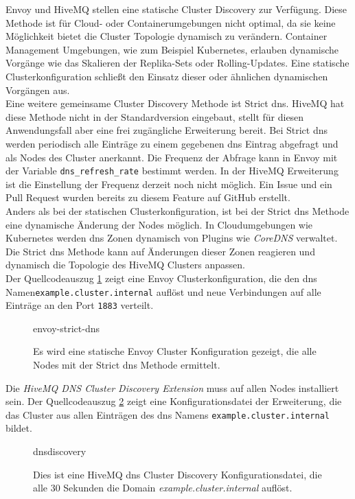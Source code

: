Envoy und HiveMQ stellen eine statische Cluster Discovery zur Verfügung. Diese Methode ist für Cloud- oder Containerumgebungen nicht optimal, da sie keine Möglichkeit bietet die Cluster Topologie dynamisch zu verändern. Container Management Umgebungen, wie zum Beispiel Kubernetes, erlauben dynamische Vorgänge wie das Skalieren der Replika-Sets oder Rolling-Updates. Eine statische Clusterkonfiguration schlie{\ss}t den Einsatz dieser oder ähnlichen dynamischen Vorgängen aus.\\
Eine weitere gemeinsame Cluster Discovery Methode ist Strict \ac{dns}. HiveMQ hat diese Methode nicht in der Standardversion eingebaut, stellt für diesen Anwendungsfall aber eine frei zugängliche Erweiterung bereit.
Bei Strict \ac{dns} werden periodisch alle Einträge zu einem gegebenen \ac{dns} Eintrag abgefragt und als Nodes des Cluster anerkannt. Die Frequenz der Abfrage kann in Envoy mit der Variable \verb|dns_refresh_rate| bestimmt werden. In der HiveMQ Erweiterung ist die Einstellung der Frequenz derzeit noch nicht möglich. Ein Issue \cite{AllowConfigurationDiscovery} und ein Pull Request \cite{ExponentialBackoffGeneral} wurden bereits zu diesem Feature auf GitHub erstellt.
\\
Anders als bei der statischen Clusterkonfiguration, ist bei der Strict \ac{dns} Methode eine dynamische Änderung der Nodes möglich. In Cloudumgebungen wie Kubernetes werden \ac{dns} Zonen dynamisch von Plugins wie \textit{CoreDNS} verwaltet.\cite{DNSServicesPods}
Die Strict \ac{dns} Methode kann auf Änderungen dieser Zonen reagieren und dynamisch die Topologie des HiveMQ Clusters anpassen.
\\
Der Quellcodeauszug \ref{code:envoy-strict-dns} zeigt eine Envoy Clusterkonfiguration, die den \ac{dns} Namen\newline \verb|example.cluster.internal| auflöst und neue Verbindungen auf alle Einträge an den Port \verb|1883| verteilt.
\begin{figure}
    {envoy-strict-dns}
    \caption{Es wird eine statische Envoy Cluster Konfiguration gezeigt, die alle Nodes mit der Strict \ac{dns} Methode ermittelt.}
    \label{code:envoy-strict-dns}
\end{figure}
Die \textit{HiveMQ DNS Cluster Discovery Extension} \cite{HiveMQExtensionDNS} muss auf allen Nodes installiert sein. Der Quellcodeauszug \ref{code:hivemq-dnsdiscovery} zeigt eine Konfigurationsdatei der Erweiterung, die das Cluster aus allen Einträgen des \ac{dns} Namens \verb|example.cluster.internal| bildet.
\begin{figure}
    {dnsdiscovery}
    \caption{Dies ist eine HiveMQ \ac{dns} Cluster Discovery Konfigurationsdatei, die alle 30 Sekunden die Domain \textit{example.cluster.internal} auflöst.}
    \label{code:hivemq-dnsdiscovery}
\end{figure}

